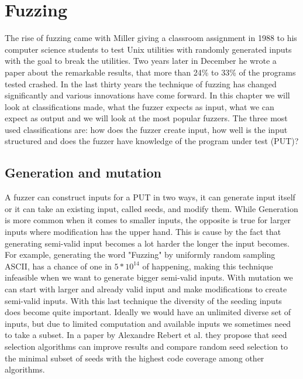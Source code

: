 \chapter{Fuzzing}
\label{cha:2:fuzzing}
\label{cha:2:intro}
The rise of fuzzing came with Miller giving a classroom assignment\cite{21FuzzingAssignment} in 1988 to his computer science students to test Unix utilities with randomly generated inputs with the goal to break the utilities. Two years later in December he wrote a paper\cite{4originalFuzzingUnixUtils} about the remarkable results, that more than 24\% to 33\% of the programs tested crashed.
In the last thirty years the technique of fuzzing has changed significantly and various innovations have come forward. In this chapter we will look at classifications made, what the fuzzer expects as input, what we can expect as output and we will look at the most popular fuzzers.
The three most used classifications are\cite{12Fuzzingasurvey}\cite{13manes2019survey}\cite{30FuzzingHackartandscience}: how does the fuzzer create input, how well is the input structured and does the fuzzer have knowledge of the program under test (PUT)?

\section{Generation and mutation}
\label{cha:2:generationMutation}
A fuzzer can construct inputs for a PUT in two ways, it can generate input itself or it can take an existing input, called seeds, and modify them. While Generation is more common when it comes to smaller inputs, the opposite is true for larger inputs where modification has the upper hand. This is cause by the fact that generating semi-valid input becomes a lot harder the longer the input becomes. For example, generating the word "Fuzzing" by uniformly random sampling ASCII, has a chance of one in $5*10^{14}$ of happening, making this technique infeasible when we want to generate bigger semi-valid inputs. With mutation we can start with larger and already valid input and make modifications to create semi-valid inputs. With this last technique the diversity of the seeding inputs does become quite important. Ideally we would have an unlimited diverse set of inputs, but due to limited computation and available inputs we sometimes need to take a subset. In a paper by Alexandre Rebert et al. \cite{14rebert2014seedselecting} they propose that seed selection algorithms can improve results and compare random seed selection to the minimal subset of seeds with the highest code coverage among other algorithms. 

